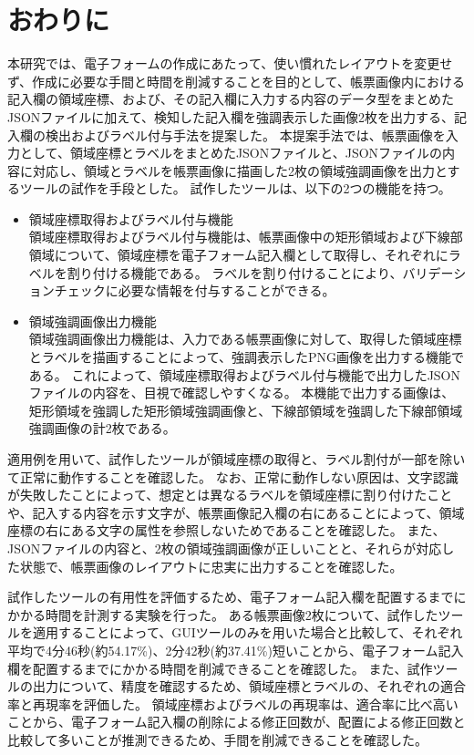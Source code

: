 \chapter{おわりに}\label{cha:Conclusion}
本研究では、電子フォームの作成にあたって、使い慣れたレイアウトを変更せず、作成に必要な手間と時間を削減することを目的として、帳票画像内における記入欄の領域座標、および、その記入欄に入力する内容のデータ型をまとめたJSONファイルに加えて、検知した記入欄を強調表示した画像2枚を出力する、記入欄の検出およびラベル付与手法を提案した。
本提案手法では、帳票画像を入力として、領域座標とラベルをまとめたJSONファイルと、JSONファイルの内容に対応し、領域とラベルを帳票画像に描画した2枚の領域強調画像を出力とするツールの試作を手段とした。
試作したツールは、以下の2つの機能を持つ。

\begin{itemize}
  \item 領域座標取得およびラベル付与機能\\
      領域座標取得およびラベル付与機能は、帳票画像中の矩形領域および下線部領域について、領域座標を電子フォーム記入欄として取得し、それぞれにラベルを割り付ける機能である。
      ラベルを割り付けることにより、バリデーションチェックに必要な情報を付与することができる。
  \item 領域強調画像出力機能\\
      領域強調画像出力機能は、入力である帳票画像に対して、取得した領域座標とラベルを描画することによって、強調表示したPNG画像を出力する機能である。
      これによって、領域座標取得およびラベル付与機能で出力したJSONファイルの内容を、目視で確認しやすくなる。
      本機能で出力する画像は、矩形領域を強調した矩形領域強調画像と、下線部領域を強調した下線部領域強調画像の計2枚である。
\end{itemize}

適用例を用いて、試作したツールが領域座標の取得と、ラベル割付が一部を除いて正常に動作することを確認した。
なお、正常に動作しない原因は、文字認識が失敗したことによって、想定とは異なるラベルを領域座標に割り付けたことや、記入する内容を示す文字が、帳票画像記入欄の右にあることによって、領域座標の右にある文字の属性を参照しないためであることを確認した。
また、JSONファイルの内容と、2枚の領域強調画像が正しいことと、それらが対応した状態で、帳票画像のレイアウトに忠実に出力することを確認した。

試作したツールの有用性を評価するため、電子フォーム記入欄を配置するまでにかかる時間を計測する実験を行った。
ある帳票画像2枚について、試作したツールを適用することによって、GUIツールのみを用いた場合と比較して、それぞれ平均で4分46秒(約54.17\%)、2分42秒(約37.41\%)短いことから、電子フォーム記入欄を配置するまでにかかる時間を削減できることを確認した。
また、試作ツールの出力について、精度を確認するため、領域座標とラベルの、それぞれの適合率と再現率を評価した。
領域座標およびラベルの再現率は、適合率に比べ高いことから、電子フォーム記入欄の削除による修正回数が、配置による修正回数と比較して多いことが推測できるため、手間を削減できることを確認した。

